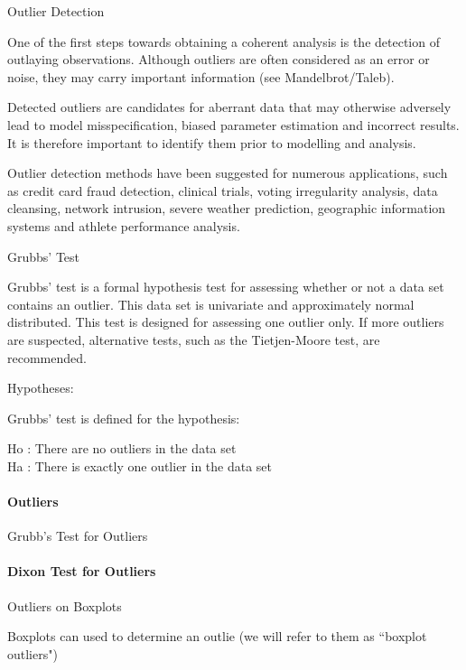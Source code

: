 
    

    
    Outlier Detection

One of the first steps towards obtaining a coherent analysis is the
detection of outlaying observations. Although outliers are often
considered as an error or noise, they may carry important information
(see Mandelbrot/Taleb).

Detected outliers are candidates for aberrant data that may otherwise
adversely lead to model misspecification, biased parameter estimation
and incorrect results. It is therefore important to identify them prior
to modelling and analysis.

Outlier detection methods have been suggested for numerous applications,
such as credit card fraud detection, clinical trials, voting
irregularity analysis, data cleansing, network intrusion, severe weather
prediction, geographic information systems and athlete performance
analysis.

    Grubbs' Test

Grubbs' test is a formal hypothesis test for assessing whether or not a
data set contains an outlier. This data set is univariate and
approximately normal distributed. This test is designed for assessing
one outlier only. If more outliers are suspected, alternative tests,
such as the Tietjen-Moore test, are recommended.

Hypotheses:

Grubbs' test is defined for the hypothesis:

Ho : There are no outliers in the data set\\
Ha : There is exactly one outlier in the data set

    \paragraph{Outliers}\label{outliers}

Grubb's Test for Outliers

    \paragraph{Dixon Test for Outliers}\label{dixon-test-for-outliers}

Outliers on Boxplots

Boxplots can used to determine an outlie (we will refer to them as
``boxplot outliers")

